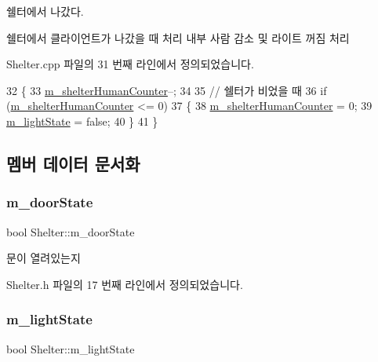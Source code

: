 쉘터에서 나갔다. 

쉘터에서 클라이언트가 나갔을 때 처리  내부 사람 감소 및 라이트 꺼짐 처리 

Shelter.\+cpp 파일의 31 번째 라인에서 정의되었습니다.


\begin{DoxyCode}
32 \{
33     \hyperlink{class_shelter_a31a7132fc38ce768924bb59302d02d82}{m\_shelterHumanCounter}--;
34 
35     \textcolor{comment}{// 쉘터가 비었을 때}
36     \textcolor{keywordflow}{if} (\hyperlink{class_shelter_a31a7132fc38ce768924bb59302d02d82}{m\_shelterHumanCounter} <= 0)
37     \{
38         \hyperlink{class_shelter_a31a7132fc38ce768924bb59302d02d82}{m\_shelterHumanCounter} = 0;
39         \hyperlink{class_shelter_ad18359b14559c0f0e77fdb416b39529f}{m\_lightState} = \textcolor{keyword}{false};
40     \}
41 \}
\end{DoxyCode}


\subsection{멤버 데이터 문서화}
\mbox{\label{class_shelter_a8deab51bd304b5cb728c2e739f5afa15}} 
\subsubsection{\texorpdfstring{m\+\_\+door\+State}{m\_doorState}}
{\footnotesize\ttfamily bool Shelter\+::m\+\_\+door\+State\hspace{0.3cm}{\ttfamily [private]}}



문이 열려있는지 



Shelter.\+h 파일의 17 번째 라인에서 정의되었습니다.

\mbox{\label{class_shelter_ad18359b14559c0f0e77fdb416b39529f}} 
\subsubsection{\texorpdfstring{m\+\_\+light\+State}{m\_lightState}}
{\footnotesize\ttfamily bool Shelter\+::m\+\_\+light\+State\hspace{0.3cm}{\ttfamily [private]}}



